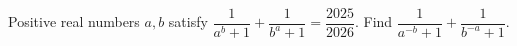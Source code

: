 Positive real numbers $a,b$ satisfy $\dfrac{1}{a^b+1}+\dfrac{1}{b^a+1}=\dfrac{2025}{2026}$. Find $\dfrac{1}{a^{-b}+1}+\dfrac{1}{b^{-a}+1}$.
